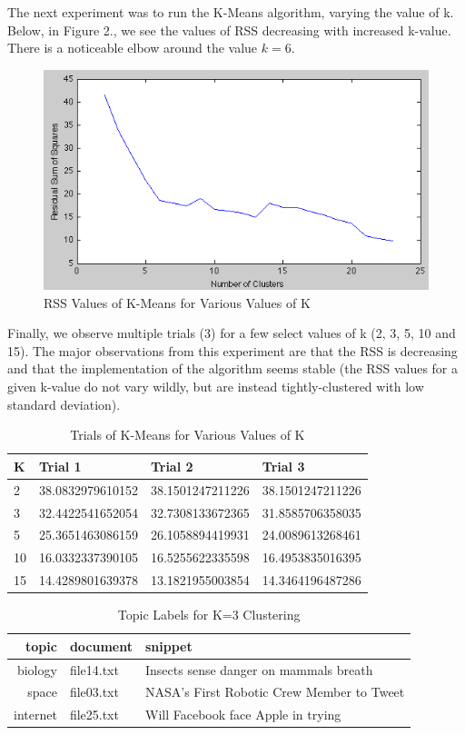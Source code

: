 \documentclass[12pt]{article}
\begin{document}
\newpage
The next experiment was to run the K-Means algorithm, varying the value of k. Below, in Figure 2., we see the values of RSS decreasing with increased k-value. There is a noticeable elbow around the value $k = 6$.
\begin{figure}[h!]
  \centering
  \includegraphics[scale=0.6]{plot.png}
  \caption{RSS Values of K-Means for Various Values of K}
\end{figure}

Finally, we observe multiple trials (3) for a few select values of k (2, 3, 5, 10 and 15). The major observations from this experiment are that the RSS is decreasing and that the implementation of the algorithm seems stable (the RSS  values for a given k-value do not vary wildly, but are instead tightly-clustered with low standard deviation).

\begin{table}[h!]
  \centering
  \begin{tabular}{l|l|l|l}
    K &Trial 1 &Trial 2 &Trial 3\\
    \hline
    2 &38.0832979610152 &38.1501247211226 &38.1501247211226\\
    3 &32.4422541652054 &32.7308133672365 &31.8585706358035\\
    5 &25.3651463086159 &26.1058894419931 &24.0089613268461\\
    10 &16.0332337390105 &16.5255622335598 &16.4953835016395\\
    15 &14.4289801639378 &13.1821955003854 &14.3464196487286\\
  \end{tabular}
  \caption{Trials of K-Means for Various Values of K}
\end{table}

\newpage
\begin{table}[h!]
  \centering
  \begin{tabular}{r|ll}
    topic     &document   &snippet\\
    \hline
    biology   &file14.txt &Insects sense danger on mammals breath\\
    space     &file03.txt &NASA's First Robotic Crew Member to Tweet\\
    internet  &file25.txt &Will Facebook face Apple in trying
  \end{tabular}
  \caption{Topic Labels for K=3 Clustering}
\end{table}
\end{document}

